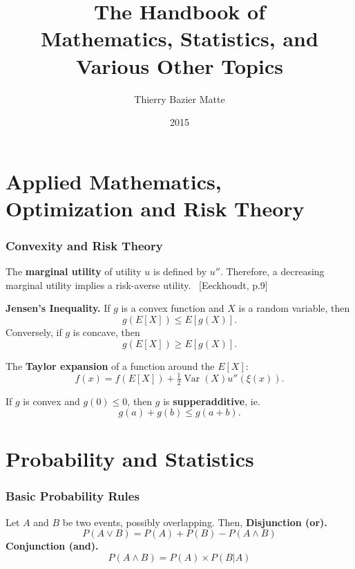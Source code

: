 \documentclass[10pt]{article}
\title{The Handbook of\\Mathematics, Statistics, and Various Other Topics}
\author{Thierry Bazier Matte}
\date{2015}
\DeclareMathOperator{\Var}{Var}
\newcommand{\reff}[1]{\mbox{}~\hfill \footnotesize{[#1]}\normalsize}
\begin{document}
\maketitle

\part{Applied Mathematics, Optimization and Risk Theory}

\section{Convexity and Risk Theory}
\begin{outline}
\1 The \textbf{marginal utility} of utility $u$ is defined by $u''$. Therefore, a
decreasing marginal utility implies a risk-averse utility.
\reff{Eeckhoudt, p.9}

\1 \textbf{Jensen's Inequality.} If $g$ is a convex function and $X$ is a
random variable, then
\begin{equation*}
  g(E[X]) \leq E[g(X)].
\end{equation*}
Conversely, if $g$ is concave, then
\begin{equation*}
  g(E[X]) \geq E[g(X)].
\end{equation*}

\1 The \textbf{Taylor expansion} of a function around the $E[X]$:
\begin{equation*}
  f(x) = f(E[X]) + \tfrac{1}{2}\Var(X)u''(\xi(x)).
\end{equation*}

\1 If $g$ is convex and $g(0)\leq0$, then $g$ is \textbf{supperadditive}, ie.
\begin{equation*}
  g(a) + g(b) \leq g(a+b).
\end{equation*}


\end{outline}

\part{Probability and Statistics}

\section{Basic Probability Rules}
\begin{outline}
Let $A$ and $B$ be two events, possibly overlapping. Then,
\1 \textbf{Disjunction (or).} 
\begin{equation*}
  P(A\vee B) = P(A) + P(B) - P(A \wedge B)
\end{equation*}
\1 \textbf{Conjunction (and).}
\begin{equation*}
  P(A\wedge B) = P(A)\times P(B|A)
\end{equation*}
\end{outline}
\end{document}
